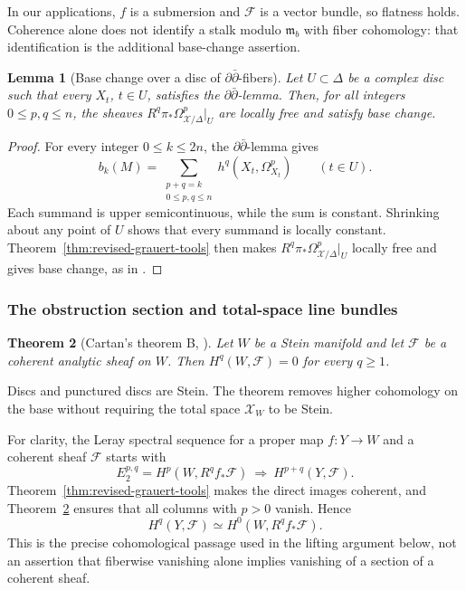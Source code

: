 \documentclass[11pt]{amsart}
\numberwithin{equation}{section}
\theoremstyle{plain}
\newtheorem{thm}{Theorem}[section]
\newtheorem{lemma}[thm]{Lemma}
\theoremstyle{definition}
\newcommand{\cF}{\mathcal F}
\newcommand{\cX}{\mathcal X}
\begin{document}
In our applications, $f$ is a
submersion and $\cF$ is a vector bundle, so flatness holds.  Coherence
alone does not identify a stalk modulo $\mathfrak m_b$ with fiber
cohomology: that identification is the additional base-change assertion.

\begin{lemma}[Base change over a disc of
$\partial\bar\partial$-fibers]\label{lem:revised-ddbar-base-change}
Let $U\subset\Delta$ be a complex disc such that every $X_t$, $t\in U$,
satisfies the $\partial\bar\partial$-lemma.  Then, for all integers
$0\le p,q\le n$, the sheaves
$R^q\pi_*\Omega^p_{\cX/\Delta}|_U$ are locally free and satisfy base change.
\end{lemma}

\begin{proof}
For every integer $0\le k\le 2n$, the $\partial\bar\partial$-lemma gives
\begin{equation*}
 b_k(M)=\sum_{\substack{p+q=k\\0\le p,q\le n}}
 h^q(X_t,\Omega^p_{X_t})\qquad(t\in U).
\end{equation*}
Each summand is upper semicontinuous, while the sum is constant.  Shrinking
about any point of $U$ shows that every summand is locally constant.
Theorem~\ref{thm:revised-grauert-tools} then makes $R^q\pi_*\Omega^p_{\cX/\Delta}|_U$ locally free
and gives base change, as in
\cite[Satz~5]{Gr60}.
\end{proof}

\subsubsection{The obstruction section and total-space line bundles}
\begin{thm}[Cartan's theorem B,
{\cite[Theorem~B]{Ca53}}]\label{thm:revised-cartan}
Let $W$ be a Stein manifold and let $\cF$ be a coherent analytic sheaf
on $W$.  Then $H^q(W,\cF)=0$ for every $q\ge1$.
\end{thm}

Discs and punctured discs are Stein.  The theorem removes higher
cohomology on the base without requiring the total space $\cX_W$
to be Stein.

For clarity, the Leray spectral sequence for a proper map $f:Y\to W$
and a coherent sheaf $\cF$ starts with
\[
 E_2^{p,q}=H^p(W,R^qf_*\cF)\ \Longrightarrow\ H^{p+q}(Y,\cF).
\]
Theorem~\ref{thm:revised-grauert-tools} makes the direct images coherent, and
Theorem~\ref{thm:revised-cartan} ensures that all columns with $p>0$ vanish.  Hence
\[
 H^q(Y,\cF)\simeq H^0(W,R^qf_*\cF).
\]
This is the precise cohomological passage used in the lifting argument
below, not an assertion that fiberwise vanishing alone implies vanishing
of a section of a coherent sheaf.
\end{document}
